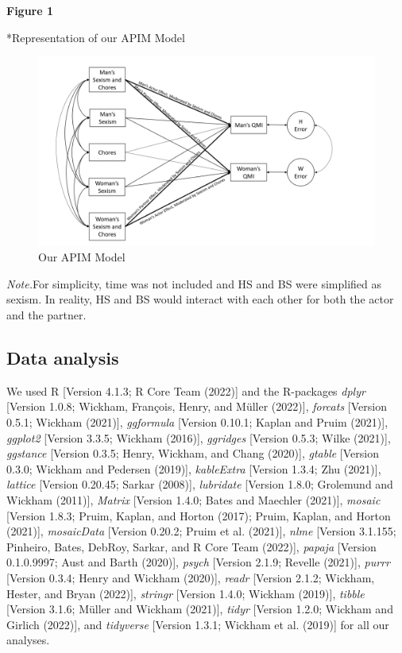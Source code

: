 \documentclass[
  man]{apa6}
\begin{document}
\textbf{Figure 1}

*Representation of our APIM Model

\begin{figure}
\centering
\includegraphics{APIM.png}
\caption{Our APIM Model}
\end{figure}

\emph{Note.}For simplicity, time was not included and HS and BS were simplified as sexism. In reality, HS and BS would interact with each other for both the actor and the partner.

\hypertarget{data-analysis}{%
\subsection{Data analysis}\label{data-analysis}}

We used R {[}Version 4.1.3; R Core Team (2022){]} and the R-packages \emph{dplyr} {[}Version 1.0.8; Wickham, François, Henry, and Müller (2022){]}, \emph{forcats} {[}Version 0.5.1; Wickham (2021){]}, \emph{ggformula} {[}Version 0.10.1; Kaplan and Pruim (2021){]}, \emph{ggplot2} {[}Version 3.3.5; Wickham (2016){]}, \emph{ggridges} {[}Version 0.5.3; Wilke (2021){]}, \emph{ggstance} {[}Version 0.3.5; Henry, Wickham, and Chang (2020){]}, \emph{gtable} {[}Version 0.3.0; Wickham and Pedersen (2019){]}, \emph{kableExtra} {[}Version 1.3.4; Zhu (2021){]}, \emph{lattice} {[}Version 0.20.45; Sarkar (2008){]}, \emph{lubridate} {[}Version 1.8.0; Grolemund and Wickham (2011){]}, \emph{Matrix} {[}Version 1.4.0; Bates and Maechler (2021){]}, \emph{mosaic} {[}Version 1.8.3; Pruim, Kaplan, and Horton (2017); Pruim, Kaplan, and Horton (2021){]}, \emph{mosaicData} {[}Version 0.20.2; Pruim et al. (2021){]}, \emph{nlme} {[}Version 3.1.155; Pinheiro, Bates, DebRoy, Sarkar, and R Core Team (2022){]}, \emph{papaja} {[}Version 0.1.0.9997; Aust and Barth (2020){]}, \emph{psych} {[}Version 2.1.9; Revelle (2021){]}, \emph{purrr} {[}Version 0.3.4; Henry and Wickham (2020){]}, \emph{readr} {[}Version 2.1.2; Wickham, Hester, and Bryan (2022){]}, \emph{stringr} {[}Version 1.4.0; Wickham (2019){]}, \emph{tibble} {[}Version 3.1.6; Müller and Wickham (2021){]}, \emph{tidyr} {[}Version 1.2.0; Wickham and Girlich (2022){]}, and \emph{tidyverse} {[}Version 1.3.1; Wickham et al. (2019){]} for all our analyses.
\end{document}
